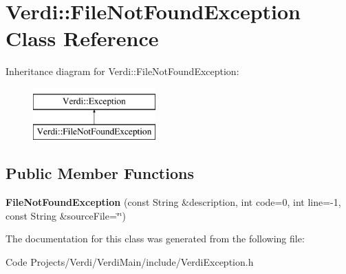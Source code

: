 \hypertarget{class_verdi_1_1_file_not_found_exception}{\section{\-Verdi\-:\-:\-File\-Not\-Found\-Exception \-Class \-Reference}
\label{class_verdi_1_1_file_not_found_exception}
}
\-Inheritance diagram for \-Verdi\-:\-:\-File\-Not\-Found\-Exception\-:\begin{figure}[H]
\begin{center}
\leavevmode
\includegraphics[height=2.000000cm]{class_verdi_1_1_file_not_found_exception}
\end{center}
\end{figure}
\subsection*{\-Public \-Member \-Functions}
\begin{DoxyCompactItemize}
\item 
\hypertarget{class_verdi_1_1_file_not_found_exception_a2c423ae6da5ad2651a7f5581cfdaf905}{{\bfseries \-File\-Not\-Found\-Exception} (const \-String \&description, int code=0, int line=-\/1, const \-String \&source\-File=\char`\"{}\char`\"{})}\label{class_verdi_1_1_file_not_found_exception_a2c423ae6da5ad2651a7f5581cfdaf905}

\end{DoxyCompactItemize}


\-The documentation for this class was generated from the following file\-:\begin{DoxyCompactItemize}
\item 
\-Code Projects/\-Verdi/\-Verdi\-Main/include/\-Verdi\-Exception.\-h\end{DoxyCompactItemize}
